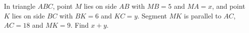 In triangle $ABC$, point $M$ lies on side $AB$ with $MB=5$ and $MA=x$, and point $K$ lies on side $BC$ with $BK=6$ and $KC=y$. Segment $MK$ is parallel to $AC$, $AC=18$ and $MK=9$. Find $x+y$.
